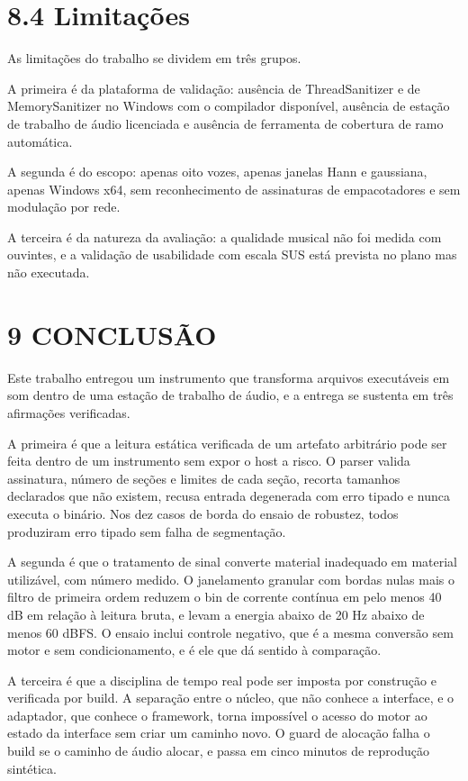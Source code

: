 \documentclass[12pt,a4paper]{article}
\begin{document}
\section*{8.4 Limitações}

As limitações do trabalho se dividem em três grupos.


A primeira é da plataforma de validação: ausência de ThreadSanitizer e de MemorySanitizer no Windows com o compilador disponível, ausência de estação de trabalho de áudio licenciada e ausência de ferramenta de cobertura de ramo automática.


A segunda é do escopo: apenas oito vozes, apenas janelas Hann e gaussiana, apenas Windows x64, sem reconhecimento de assinaturas de empacotadores e sem modulação por rede.


A terceira é da natureza da avaliação: a qualidade musical não foi medida com ouvintes, e a validação de usabilidade com escala SUS está prevista no plano mas não executada.


\section*{9 CONCLUSÃO}

Este trabalho entregou um instrumento que transforma arquivos executáveis em som dentro de uma estação de trabalho de áudio, e a entrega se sustenta em três afirmações verificadas.


A primeira é que a leitura estática verificada de um artefato arbitrário pode ser feita dentro de um instrumento sem expor o host a risco. O parser valida assinatura, número de seções e limites de cada seção, recorta tamanhos declarados que não existem, recusa entrada degenerada com erro tipado e nunca executa o binário. Nos dez casos de borda do ensaio de robustez, todos produziram erro tipado sem falha de segmentação.


A segunda é que o tratamento de sinal converte material inadequado em material utilizável, com número medido. O janelamento granular com bordas nulas mais o filtro de primeira ordem reduzem o bin de corrente contínua em pelo menos 40 dB em relação à leitura bruta, e levam a energia abaixo de 20 Hz abaixo de menos 60 dBFS. O ensaio inclui controle negativo, que é a mesma conversão sem motor e sem condicionamento, e é ele que dá sentido à comparação.


A terceira é que a disciplina de tempo real pode ser imposta por construção e verificada por build. A separação entre o núcleo, que não conhece a interface, e o adaptador, que conhece o framework, torna impossível o acesso do motor ao estado da interface sem criar um caminho novo. O guard de alocação falha o build se o caminho de áudio alocar, e passa em cinco minutos de reprodução sintética.
\end{document}
